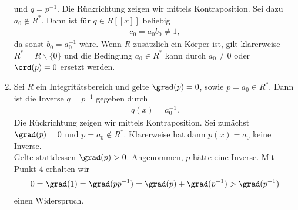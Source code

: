\begin{solution}
\begin{enumerate}
  und $q = p^{-1}$. Die Rückrichtung zeigen wir mittels Kontraposition. Sei dazu $a_0 \notin R^*$.
  Dann ist für $q \in R[[x]]$ beliebig
  \begin{align*}
    c_0  = a_0b_0 \neq 1,
  \end{align*}
  da sonst $b_0 = a_0^{-1}$ wäre.
  Wenn $R$ zusätzlich ein Körper ist, gilt klarerweise $R^* = R\backslash \{0\}$
  und die Bedingung $a_0 \in R^*$ kann durch $a_0 \neq 0$ oder $\ord(p) = 0$ ersetzt werden.
  \item Sei $R$ ein Integritätsbereich und gelte $\grad(p) = 0$, sowie $p = a_0 \in R^*$.
  Dann ist die Inverse $q = p^{-1}$ gegeben durch
  \begin{align*}
    q(x) = a_0^{-1}.
  \end{align*}
  Die Rückrichtung zeigen wir mittels Kontraposition.
  Sei zunächst $\grad(p) = 0$ und $p = a_0 \notin R^*$.
  Klarerweise hat dann $p(x) = a_0$ keine Inverse. \\
  Gelte stattdessen $\grad(p) > 0$. Angenommen, $p$ hätte eine Inverse.
  Mit Punkt 4 erhalten wir
  \begin{align*}
    0 = \grad(1) = \grad(pp^{-1}) = \grad(p) + \grad(p^{-1}) > \grad(p^{-1})
  \end{align*}
  einen Widerspruch.
\end{enumerate}
\end{solution}
